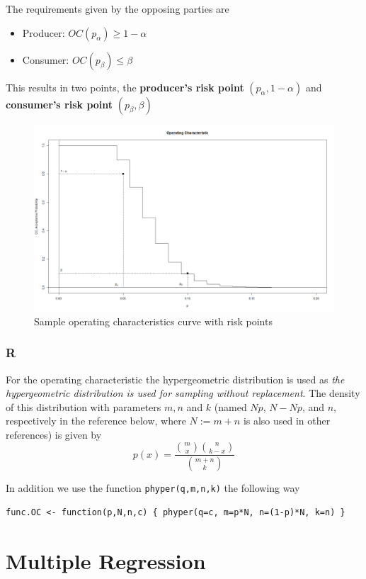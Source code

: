 \documentclass[11pt]{article}
\theoremstyle{definition}
\begin{document}
The requirements given by the opposing parties are
\begin{itemize}
	\item Producer: $OC(p_\alpha) \geq 1-\alpha$
	\item Consumer: $OC(p_\beta) \leq \beta$
\end{itemize}
This results in two points, the \textbf{producer's risk point} $(p_\alpha, 1-\alpha)$ and \textbf{consumer's risk point} $(p_\beta, \beta)$
\begin{figure}[H]
	\centering
	\includegraphics[width=0.8\linewidth]{img/OC_curve_points.png}
	\caption{Sample operating characteristics curve with risk points}
\end{figure}

\subsubsection{R}
For the operating characteristic the hypergeometric distribution is used as \textit{the hypergeometric distribution is used for sampling without replacement}. The density of this distribution with parameters $m, n$ and $k$ (named $Np$, $N-Np$, and $n$, respectively in the reference below, where $N := m+n$ is also used in other references) is given by 
\begin{equation*}
	p(x) = \frac{\binom{m}{x}\binom{n}{k-x}}{\binom{m+n}{k}}
\end{equation*}

In addition we use the function \texttt{phyper(q,m,n,k)} the following way
\begin{verbatim}
func.OC <- function(p,N,n,c) { phyper(q=c, m=p*N, n=(1-p)*N, k=n) }
\end{verbatim}

\section{Multiple Regression}
\end{document}
